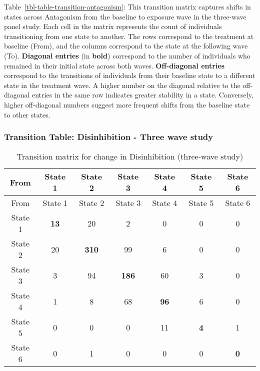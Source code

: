 \documentclass[
  single column]{article}
\begin{document}
Table~\ref{tbl-table-transition-antagonism}: This transition matrix
captures shifts in states across Antagonism from the baseline to
exposure wave in the three-wave panel study. Each cell in the matrix
represents the count of individuals transitioning from one state to
another. The rows correspond to the treatment at baseline (From), and
the columns correspond to the state at the following wave (To).
\textbf{Diagonal entries} (in \textbf{bold}) correspond to the number of
individuals who remained in their initial state across both waves.
\textbf{Off-diagonal entries} correspond to the transitions of
individuals from their baseline state to a different state in the
treatment wave. A higher number on the diagonal relative to the
off-diagonal entries in the same row indicates greater stability in a
state. Conversely, higher off-diagonal numbers suggest more frequent
shifts from the baseline state to other states.

\subsubsection{Transition Table: Disinhibition - Three wave
study}\label{transition-table-disinhibition---three-wave-study}

\begin{longtable}[]{@{}ccccccc@{}}
\caption{Transition matrix for change in Disinhibition (three-wave
study)}\label{tbl-table-transition-disinhibition}\tabularnewline
\toprule\noalign{}
From & State 1 & State 2 & State 3 & State 4 & State 5 & State 6 \\
\midrule\noalign{}
\endfirsthead
\toprule\noalign{}
From & State 1 & State 2 & State 3 & State 4 & State 5 & State 6 \\
\midrule\noalign{}
\endhead
\bottomrule\noalign{}
\endlastfoot
State 1 & \textbf{13} & 20 & 2 & 0 & 0 & 0 \\
State 2 & 20 & \textbf{310} & 99 & 6 & 0 & 0 \\
State 3 & 3 & 94 & \textbf{186} & 60 & 3 & 0 \\
State 4 & 1 & 8 & 68 & \textbf{96} & 6 & 0 \\
State 5 & 0 & 0 & 0 & 11 & \textbf{4} & 1 \\
State 6 & 0 & 1 & 0 & 0 & 0 & \textbf{0} \\
\end{longtable}
\end{document}
